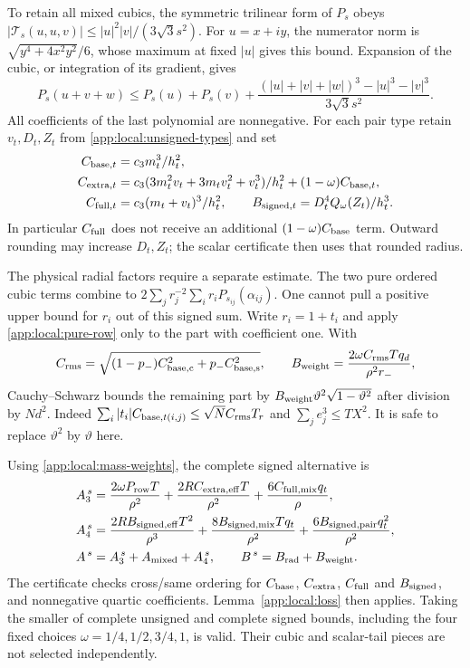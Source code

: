 To retain all mixed cubics, the symmetric trilinear form of $P_s$ obeys
$|\mathcal T_s(u,u,v)|\le|u|^2|v|/(3\sqrt3s^2)$.
For $u=x+iy$, the numerator norm is
$\sqrt{y^4+4x^2y^2}/6$, whose maximum at fixed $|u|$ gives this bound.
Expansion of the cubic, or integration of its gradient, gives
\[
 P_s(u+v+w)\le P_s(u)+P_s(v)+
 \frac{(|u|+|v|+|w|)^3-|u|^3-|v|^3}{3\sqrt3s^2}.
\]
All coefficients of the last polynomial are nonnegative.
For each pair type retain $v_t,D_t,Z_t$ from
\eqref{app:local:unsigned-types} and set
\begin{align}
 C_{{\rm base},t}&=c_3m_t^3/h_t^2,\nonumber\\
 C_{{\rm extra},t}&=
 c_3(3m_t^2v_t+3m_tv_t^2+v_t^3)/h_t^2
                      +(1-\omega)C_{{\rm base},t},\nonumber\\
 C_{{\rm full},t}&=c_3(m_t+v_t)^3/h_t^2,\qquad
 B_{{\rm signed},t}=D_t^4Q_\omega(Z_t)/h_t^3.
 \label{app:local:signed-types}
\end{align}
In particular $C_{\rm full}$ does not receive an additional
$(1-\omega)C_{\rm base}$ term. Outward rounding may increase $D_t,Z_t$;
the scalar certificate then uses that rounded radius.

The physical radial factors require a separate estimate. The two pure
ordered cubic terms combine to
$2\sum_jr_j^{-2}\sum_ir_iP_{s_{ij}}(\alpha_{ij})$.
One cannot pull a positive upper bound for $r_i$ out of this signed sum.
Write $r_i=1+t_i$ and apply \eqref{app:local:pure-row} only to the part
with coefficient one. With
\[
 C_{\rm rms}=\sqrt{(1-p_-)C_{{\rm base},{\mathrm c}}^2+
                         p_-C_{{\rm base},{\mathrm s}}^2},
 \qquad B_{\rm weight}=\frac{2\omega C_{\rm rms}Tq_d}{\rho^2r_-},
\]
Cauchy--Schwarz bounds the remaining part by
$B_{\rm weight}\vartheta^2\sqrt{1-\vartheta^2}$ after division by $Nd^2$.
Indeed $\sum_i|t_i|C_{{\rm base},t(i,j)}
\le\sqrt N C_{\rm rms}T_r$ and $\sum_j e_j^3\le TX^2$.
It is safe to replace $\vartheta^2$ by $\vartheta$ here.

Using \eqref{app:local:mass-weights}, the complete signed alternative is
\begin{align}
 A_3^{\,s}&=\frac{2\omega P_{\rm row}T}{\rho^2}
      +\frac{2R C_{{\rm extra},{\rm eff}}T}{\rho^2}
      +\frac{6C_{{\rm full},{\rm mix}}q_t}{\rho},\nonumber\\
 A_4^{\,s}&=\frac{2RB_{{\rm signed},{\rm eff}}T^2}{\rho^3}
      +\frac{8B_{{\rm signed},{\rm mix}}Tq_t}{\rho^2}
      +\frac{6B_{{\rm signed},{\rm pair}}q_t^2}{\rho^2},\nonumber\\
 A^{\,s}&=A_3^{\,s}+A_{\rm mixed}+A_4^{\,s},\qquad
 B^{\,s}=B_{\rm rad}+B_{\rm weight}.
 \label{app:local:signed-loss}
\end{align}
The certificate checks cross/same ordering for $C_{\rm base}$,
$C_{\rm extra}$, $C_{\rm full}$ and $B_{\rm signed}$, and nonnegative
quartic coefficients. Lemma~\ref{app:local:loss} then applies.
Taking the smaller of complete unsigned and complete signed bounds,
including the four fixed choices $\omega=1/4,1/2,3/4,1$, is valid.
Their cubic and scalar-tail pieces are not selected independently.

